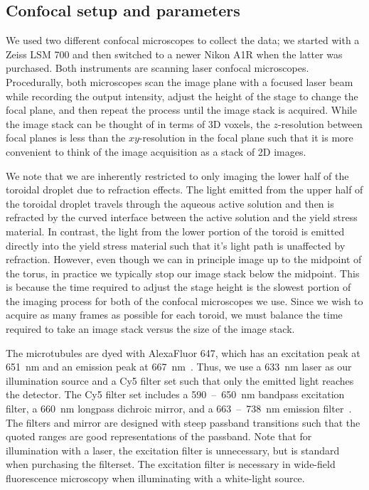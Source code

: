 \subsection{Confocal setup and parameters}
We used two different confocal microscopes to collect the data; we started with a Zeiss LSM 700 and then switched to a newer Nikon A1R when the latter was purchased.
Both instruments are scanning laser confocal microscopes.
Procedurally, both microscopes scan the image plane with a focused laser beam while recording the output intensity, adjust the height of the stage to change the focal plane, and then repeat the process until the image stack is acquired.
While the image stack can be thought of in terms of 3D voxels, the $z$-resolution between focal planes is less than the $xy$-resolution in the focal plane such that it is more convenient to think of the image acquisition as a stack of 2D images.

We note that we are inherently restricted to only imaging the lower half of the toroidal droplet due to refraction effects.
The light emitted from the upper half of the toroidal droplet travels through the aqueous active solution and then is refracted by the curved interface between the active solution and the yield stress material.
In contrast, the light from the lower portion of the toroid is emitted directly into the yield stress material such that it's light path is unaffected by refraction.
However, even though we can in principle image up to the midpoint of the torus, in practice we typically stop our image stack below the midpoint.
This is because the time required to adjust the stage height is the slowest portion of the imaging process for both of the confocal microscopes we use.
Since we wish to acquire as many frames as possible for each toroid, we must balance the time required to take an image stack versus the size of the image stack.

The microtubules are dyed with AlexaFluor 647, which has an excitation peak at 651~nm and an emission peak at 667~nm~\cite{RN264}.
Thus, we use a 633~nm laser as our illumination source and a Cy5 filter set such that only the emitted light reaches the detector.
The Cy5 filter set includes a 590~--~650~nm bandpass excitation filter, a 660~nm longpass dichroic mirror, and a 663~--~738~nm emission filter~\cite{RN263}.
The filters and mirror are designed with steep passband transitions such that the quoted ranges are good representations of the passband.
Note that for illumination with a laser, the excitation filter is unnecessary, but is standard when purchasing the filterset.
The excitation filter is necessary in wide-field fluorescence microscopy when illuminating with a white-light source.

